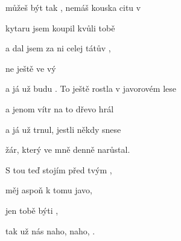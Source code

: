 

 můžeš být tak ,
 nemáš kouska citu v 
         

\zs
{} kytaru jsem koupil
kvůli tobě

a dal jsem za ni
celej tátův ,

ne ještě  ve vý 

a já už 
 budu .
\ks
\zs
To ještě rostla v javorovém lese

a jenom vítr na to dřevo hrál

a já už trnul, jestli někdy snese

žár, který ve mně denně narůstal.
\ks

\zs
S tou  teď stojím před tvým ,

měj  aspoň k tomu javo,

jen  tobě  býti , 

{tak} už nás   naho,
 naho,  .
\ks
\kp


